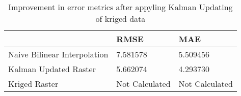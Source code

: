 \begin{table}
\caption{Improvement in error metrics after appyling Kalman Updating of kriged data}
\label{tab:Charlotteamalie_lidar_error}
\begin{tabular}{lll}
\toprule
 & RMSE & MAE \\
\midrule
Naive Bilinear Interpolation & 7.581578 & 5.509456 \\
Kalman Updated Raster & 5.662074 & 4.293730 \\
Kriged Raster & Not Calculated & Not Calculated \\
\bottomrule
\end{tabular}
\end{table}
